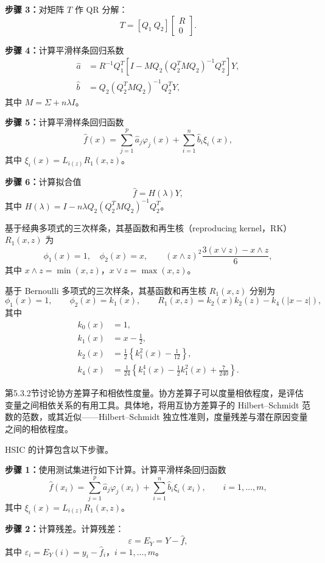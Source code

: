 \noindent\textbf{步骤 3：}对矩阵 $T$ 作 QR 分解：
\[
T=[Q_1\ Q_2]\begin{bmatrix}R\\0\end{bmatrix}.
\]

\noindent\textbf{步骤 4：}计算平滑样条回归系数
\[
\begin{aligned}
\widehat a&=R^{-1}Q_1^T
\left[I-MQ_2(Q_2^TMQ_2)^{-1}Q_2^T\right]Y,\\
\widehat b&=Q_2(Q_2^TMQ_2)^{-1}Q_2^TY,
\end{aligned}
\]
其中 $M=\Sigma+n\lambda I$。

\noindent\textbf{步骤 5：}计算平滑样条回归函数
\[
\widehat f(x)=\sum_{j=1}^{p}\widehat a_j\varphi_j(x)
+\sum_{i=1}^{n}\widehat b_i\xi_i(x),
\]
其中 $\xi_i(x)=L_{i(z)}R_1(x,z)$。

\noindent\textbf{步骤 6：}计算拟合值
\[
\widehat f=H(\lambda)Y,
\]
其中 $H(\lambda)=I-n\lambda Q_2(Q_2^TMQ_2)^{-1}Q_2^T$。

基于经典多项式的三次样条，其基函数和再生核（reproducing kernel，RK）$R_1(x,z)$ 为
\[
\phi_1(x)=1,\quad\phi_2(x)=x,
\qquad
(x\wedge z)^2\frac{3(x\vee z)-x\wedge z}{6},
\]
其中 $x\wedge z=\min(x,z)$，$x\vee z=\max(x,z)$。

基于 Bernoulli 多项式的三次样条，其基函数和再生核 $R_1(x,z)$ 分别为
\[
\phi_1(x)=1,\qquad\phi_2(x)=k_1(x),
\qquad
R_1(x,z)=k_2(x)k_2(z)-k_4(|x-z|),
\]
其中
\[
\begin{aligned}
k_0(x)&=1,\\
k_1(x)&=x-\frac12,\\
k_2(x)&=\frac12\left\{k_1^2(x)-\frac1{12}\right\},\\
k_4(x)&=\frac1{24}\left\{k_1^4(x)-\frac12k_1^2(x)+\frac7{240}\right\}.
\end{aligned}
\]

第5.3.2节讨论协方差算子和相依性度量。协方差算子可以度量相依程度，是评估变量之间相依关系的有用工具。具体地，将用互协方差算子的 Hilbert--Schmidt 范数的范数，或其近似——Hilbert--Schmidt 独立性准则，度量残差与潜在原因变量之间的相依程度。

HSIC 的计算包含以下步骤。

\noindent\textbf{步骤 1：}使用测试集进行如下计算。计算平滑样条回归函数
\[
\widehat f(x_i)=\sum_{j=1}^{p}\widehat a_j\varphi_j(x_i)
+\sum_{i=1}^{n}\widehat b_i\xi_i(x_i),
\qquad i=1,\ldots,m,
\]
其中 $\xi_i(x)=L_{i(z)}R_1(x,z)$。

\noindent\textbf{步骤 2：}计算残差。计算残差：
\begin{equation}
\varepsilon=E_Y=Y-\widehat f,
\tag{2.82}
\end{equation}
其中 $\varepsilon_i=E_Y(i)=y_i-\widehat f_i$，$i=1,\ldots,m$。


